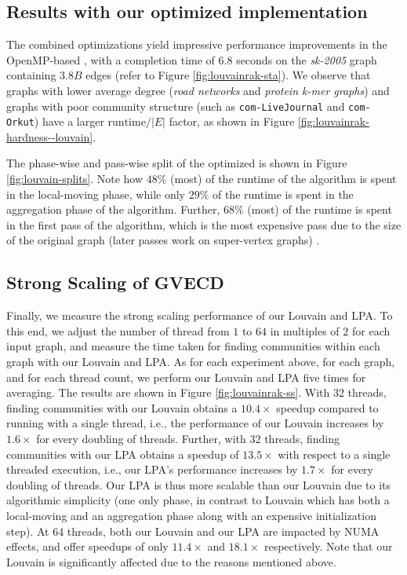 





\subsection{Results with our optimized implementation}

The combined optimizations yield impressive performance improvements in the OpenMP-based \StaLou{}, with a completion time of $6.8$ seconds on the \textit{sk-2005} graph containing $3.8 B$ edges (refer to Figure \ref{fig:louvainrak-sta}). We observe that graphs with lower average degree (\textit{road networks} and \textit{protein k-mer graphs}) and graphs with poor community structure (such as \verb|com-LiveJournal| and \verb|com-Orkut|) have a larger $\text{runtime}/|E|$ factor, as shown in Figure \ref{fig:louvainrak-hardness--louvain}.

The phase-wise and pass-wise split of the optimized \StaLou{} is shown in Figure \ref{fig:louvain-splits}. Note how $48\%$ (most) of the runtime of the algorithm is spent in the local-moving phase, while only $29\%$ of the runtime is spent in the aggregation phase of the algorithm. Further, $68\%$ (most) of the runtime is spent in the first pass of the algorithm, which is the most expensive pass due to the size of the original graph (later passes work on super-vertex graphs) \cite{com-wickramaarachchi14}.




\subsection{Strong Scaling of GVECD}

Finally, we measure the strong scaling performance of our Louvain and LPA. To this end, we adjust the number of thread from $1$ to $64$ in multiples of $2$ for each input graph, and measure the time taken for finding communities within each graph with our Louvain and LPA. As for each experiment above, for each graph, and for each thread count, we perform our Louvain and LPA five times for averaging. The results are shown in Figure \ref{fig:louvainrak-ss}. With 32 threads, finding communities with our Louvain obtains a $10.4\times$ speedup compared to running with a single thread, i.e., the performance of our Louvain increases by $1.6\times$ for every doubling of threads. Further, with 32 threads, finding communities with our LPA obtains a speedup of $13.5\times$ with respect to a single threaded execution, i.e., our LPA's performance increases by $1.7\times$ for every doubling of threads. Our LPA is thus more scalable than our Louvain due to its algorithmic simplicity (one only phase, in contrast to Louvain which has both a local-moving and an aggregation phase along with an expensive initialization step). At 64 threads, both our Louvain and our LPA are impacted by NUMA effects, and offer speedups of only $11.4\times$ and $18.1\times$ respectively. Note that our Louvain is significantly affected due to the reasons mentioned above.
